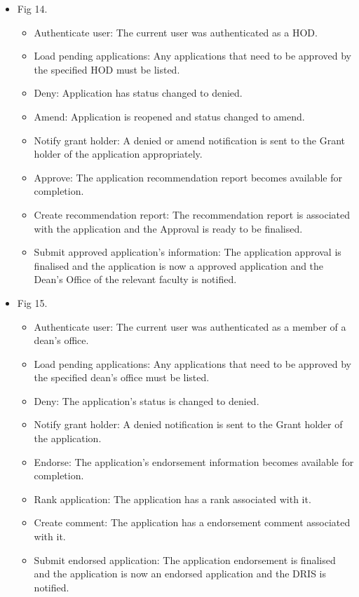 \documentclass[12pt]{article}
\begin{document}
\begin{itemize}
\begin{itemize}
		\end{itemize}	
	\item Fig 14.
		\begin{itemize}
			\item Authenticate user: The current user was authenticated as a HOD.
			\item Load pending applications: Any applications that need to be approved by the specified HOD must be listed.
			\item Deny: Application has status changed to denied.
			\item Amend: Application is reopened and status changed to amend.
			\item Notify grant holder: A denied or amend notification is sent to the Grant holder of the application appropriately.  
			\item Approve: The application recommendation report becomes available for completion.
			\item Create recommendation report: The recommendation report is associated with the application and the Approval is ready to be finalised.				
			\item Submit approved application's information: The application approval is finalised and the application is now a approved application and the Dean's Office of the relevant faculty is notified.									
		\end{itemize}
		
	\item Fig 15.
		\begin{itemize}
			\item Authenticate user: The current user was authenticated as a member of a dean's office.
			\item Load pending applications: Any applications that need to be approved by the specified dean's office must be listed.
			\item Deny: The application's status is changed to denied. 
			\item Notify grant holder: A denied notification is sent to the Grant holder of the application.
			\item Endorse: The application's endorsement information becomes available for completion.
			\item Rank application: The application has a rank associated with it.	
			\item Create comment: The application has a endorsement comment associated with it.			
			\item Submit endorsed application: The application endorsement is finalised and the application is now an endorsed application and the DRIS is notified.									
		\end{itemize}
	

\end{itemize}
\end{document}
